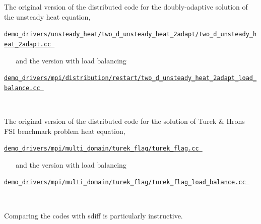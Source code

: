 \begin{DoxyEnumerate}
\begin{DoxyItemize}
\item The original version of the distributed code for the doubly-\/adaptive solution of the unsteady heat equation, ~\newline
~\newline
 \begin{center} \href{../../../../demo_drivers/unsteady_heat/two_d_unsteady_heat_2adapt/two_d_unsteady_heat_2adapt.cc}{\tt demo\+\_\+drivers/unsteady\+\_\+heat/two\+\_\+d\+\_\+unsteady\+\_\+heat\+\_\+2adapt/two\+\_\+d\+\_\+unsteady\+\_\+heat\+\_\+2adapt.\+cc } \end{center}  ~\newline
~\newline
 and the version with load balancing ~\newline
~\newline
 \begin{center} \href{../../../../demo_drivers/mpi/distribution/restart/two_d_unsteady_heat_2adapt_load_balance.cc}{\tt demo\+\_\+drivers/mpi/distribution/restart/two\+\_\+d\+\_\+unsteady\+\_\+heat\+\_\+2adapt\+\_\+load\+\_\+balance.\+cc } \end{center}  ~\newline
~\newline

\item The original version of the distributed code for the solution of Turek \& Hron\textquotesingle{}s F\+SI benchmark problem heat equation, ~\newline
~\newline
 \begin{center} \href{../../../../demo_drivers/mpi/multi_domain/turek_flag/turek_flag.cc}{\tt demo\+\_\+drivers/mpi/multi\+\_\+domain/turek\+\_\+flag/turek\+\_\+flag.\+cc } \end{center}  ~\newline
~\newline
 and the version with load balancing ~\newline
~\newline
 \begin{center} \href{../../../../demo_drivers/mpi/multi_domain/turek_flag/turek_flag_load_balance.cc}{\tt demo\+\_\+drivers/mpi/multi\+\_\+domain/turek\+\_\+flag/turek\+\_\+flag\+\_\+load\+\_\+balance.\+cc } \end{center}  ~\newline
~\newline

\end{DoxyItemize}Comparing the codes with sdiff is particularly instructive.
\end{DoxyEnumerate}


